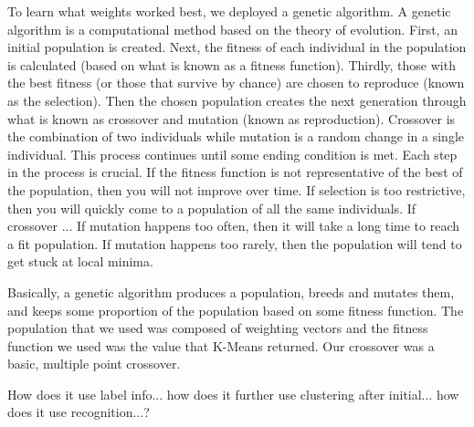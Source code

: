 \documentclass[10pt]{acmsiggraph}               %
\begin{document}
To learn what weights worked best, we deployed a genetic algorithm.
A genetic algorithm is a computational method based on the theory of evolution.
First, an initial population is created.
Next, the fitness of each individual in the population is calculated (based on what is known as a fitness function).
Thirdly, those with the best fitness (or those that survive by chance) are chosen to reproduce (known as the selection).
Then the chosen population creates the next generation through what is known as crossover and mutation (known as reproduction).
Crossover is the combination of two individuals while mutation is a random change in a single individual.
This process continues until some ending condition is met.
Each step in the process is crucial.
If the fitness function is not representative of the best of the population, then you will not improve over time.
If selection is too restrictive, then you will quickly come to a population of all the same individuals.
If crossover ...
If mutation happens too often, then it will take a long time to reach a fit population.
If mutation happens too rarely, then the population will tend to get stuck at local minima.

Basically, a genetic algorithm produces a population, breeds and mutates them, and keeps some proportion of the population based on some fitness function.
The population that we used was composed of weighting vectors and the fitness function we used was the value that K-Means returned.
Our crossover was a basic, multiple point crossover.

How does it use label info... how does it further use clustering after initial... how does it use recognition...?
\end{document}

